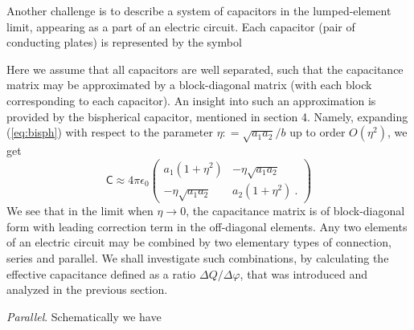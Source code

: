 \documentclass[12pt]{iopart}
\newcommand{\defeq}{\mathrel{\mathop:}=}
\newcommand{\bc}{\begin{center}}
\newcommand{\ec}{\end{center}}
\newcommand{\be}{\begin{equation}}
\newcommand{\ee}{\end{equation}}
\newcommand{\mx}[1]{\bm{\mathsf{#1}}}
\newcommand{\0}{\vct{0}}
\theoremstyle{plain} \newtheorem{tm}{Theorem}[section]
\theoremstyle{plain} \newtheorem{lm}[tm]{Lemma}
\theoremstyle{definition} \newtheorem{defn}[tm]{Definition}
\begin{document}
\medskip



Another challenge is to describe a system of capacitors in the lumped-element limit, appearing as a part of an electric circuit. Each capacitor (pair of conducting plates) is represented by the symbol

\bc
{}
\ec

\noindent
Here we assume that all capacitors are well separated, such that the capacitance matrix may be approximated by a block-diagonal matrix (with each block corresponding to each capacitor). An insight into such an approximation is provided by the bispherical capacitor, mentioned in section 4. Namely, expanding (\ref{eq:bisph}) with respect to the parameter $\eta \defeq \sqrt{a_1 a_2}/b$ up to order $O(\eta^2)$, we get
\be
\mx{C} \approx 4\pi \epsilon_0
\begin{pmatrix}
a_1 \left(1 + \eta^2 \right) & - \eta \sqrt{a_1 a_2} \\
- \eta \sqrt{a_1 a_2} & a_2 \left(1 + \eta^2 \right) \ .
\end{pmatrix}
\ee
We see that in the limit when $\eta \to 0$, the capacitance matrix is of block-diagonal form with leading correction term in the off-diagonal elements. Any two elements of an electric circuit may be combined by two elementary types of connection, series and parallel. We shall investigate such combinations, by calculating the effective capacitance defined as a ratio $\Delta Q/\Delta \varphi$, that was introduced and analyzed in the previous section.

\medskip



\emph{Parallel}. Schematically we have

\medskip

\bc
{}
\ec
\end{document}
